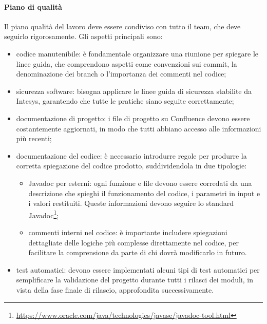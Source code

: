            \paragraph{Piano di qualità}
            Il piano qualità del lavoro deve essere condiviso con tutto il team, che deve seguirlo rigorosamente.
            Gli aspetti principali sono:
            \begin{itemize}
                \item codice manutenibile: è fondamentale organizzare una riunione per spiegare le linee guida, che comprendono aspetti
                come convenzioni sui commit, la denominazione dei branch o l'importanza dei commenti nel codice;
                \item sicurezza software: bisogna applicare le linee guida di sicurezza stabilite da Intesys, garantendo che tutte
                le pratiche siano seguite correttamente;
                \item documentazione di progetto: i file di progetto su Confluence devono essere costantemente aggiornati, in modo che tutti
                abbiano accesso alle informazioni più recenti;
                \item documentazione del codice: è necessario introdurre regole per produrre la corretta spiegazione del codice prodotto,
                suddividendola in due tipologie:
                \begin{itemize}
                    \item Javadoc per esterni: ogni funzione e file devono essere corredati da una descrizione che spieghi
                    il funzionamento del codice, i parametri in input e i valori restituiti.
                    Queste informazioni devono seguire lo standard Javadoc\footnote{\url{https://www.oracle.com/java/technologies/javase/javadoc-tool.html}};
                    \item commenti interni nel codice: è importante includere spiegazioni dettagliate delle logiche più complesse
                    direttamente nel codice, per facilitare la comprensione da parte di chi dovrà modificarlo in futuro.
                \end{itemize}
                \item test automatici: devono essere implementati alcuni tipi di test automatici per semplificare la validazione
                del progetto durante tutti i rilasci dei moduli, in vista della fase finale di rilascio, approfondita successivamente.
            \end{itemize}

